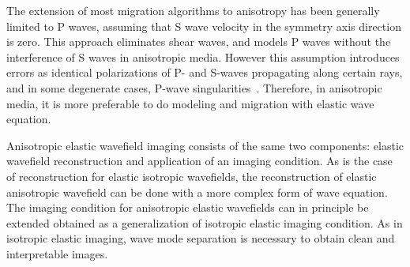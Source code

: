 The extension of most migration algorithms to anisotropy has been generally limited to P waves, assuming that S wave velocity in the symmetry axis direction is zero. This approach eliminates shear waves, and models P waves without the interference of S waves in anisotropic media. However this assumption introduces errors as identical polarizations of P- and S-waves propagating along certain rays, and in some degenerate cases, P-wave singularities~\cite[]{alkhalifah:623,grechka:576}. Therefore, in anisotropic media, it is more preferable to do modeling and migration with elastic wave equation.


Anisotropic elastic wavefield imaging consists of the same two components: elastic wavefield reconstruction and application of an imaging condition. As is the case of reconstruction for elastic isotropic wavefields, the reconstruction of elastic anisotropic wavefield can be done with a more complex form of wave equation. The imaging condition for anisotropic elastic wavefields can in principle be extended obtained as a generalization of isotropic elastic imaging condition. As in isotropic elastic imaging, wave mode separation is necessary to obtain clean and interpretable images.

